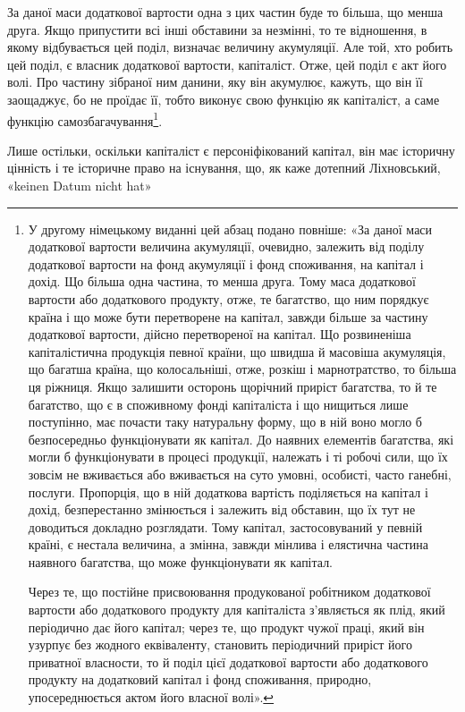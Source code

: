 За даної маси додаткової вартости одна з цих частин буде то
більша, що менша друга. Якщо припустити всі інші обставини
за незмінні, то те відношення, в якому відбувається цей поділ,
визначає величину акумуляції. Але той, хто робить цей поділ,
є власник додаткової вартости, капіталіст. Отже, цей поділ є
акт його волі. Про частину зібраної ним данини, яку він акумулює,
кажуть, що він її заощаджує, бо не проїдає її, тобто виконує
свою функцію як капіталіст, а саме функцію самозбагачування\footnote*{
У другому німецькому виданні цей абзац подано повніше: «За
даної маси додаткової вартости величина акумуляції, очевидно, залежить
від поділу додаткової вартости на фонд акумуляції і фонд споживання,
на капітал і дохід. Що більша одна частина, то менша друга. Тому маса
додаткової вартости або додаткового продукту, отже, те багатство, що
ним порядкує країна і що може бути перетворене на капітал, завжди
більше за частину додаткової вартости, дійсно перетвореної на капітал.
Що розвиненіша капіталістична продукція певної країни, що швидша
й масовіша акумуляція, що багатша країна, що колосальніші, отже,
розкіш і марнотратство, то більша ця ріжниця. Якщо залишити осторонь
щорічний приріст багатства, то й те багатство, що є в споживному фонді
капіталіста і що нищиться лише поступінно, має почасти таку натуральну
форму, що в ній воно могло б безпосередньо функціонувати як капітал.
До наявних елементів багатства, які могли б функціонувати в процесі
продукції, належать і ті робочі сили, що їх зовсім не вживається або вживається
на суто умовні, особисті, часто ганебні, послуги. Пропорція, що
в ній додаткова вартість поділяється на капітал і дохід, безперестанно
змінюється і залежить від обставин, що їх тут не доводиться докладно
розглядати. Тому капітал, застосовуваний у певній країні, є нестала
величина, а змінна, завжди мінлива і елястична частина наявного багатства,
що може функціонувати як капітал.

Через те, що постійне присвоювання продукованої робітником додаткової
вартости або додаткового продукту для капіталіста з’являється
як плід, який періодично дає його капітал; через те, що продукт чужої
праці, який він узурпує без жодного еквіваленту, становить періодичний
приріст його приватної власности, то й поділ цієї додаткової вартости або
додаткового продукту на додатковий капітал і фонд споживання, природно,
упосереднюється актом його власної волі». 
}.

Лише остільки, оскільки капіталіст є персоніфікований капітал,
він має історичну цінність і те історичне право на існування,
що, як каже дотепний Ліхновський, «keinen Datum nicht hat»
\parbreak{}  %
